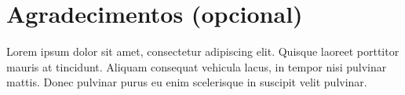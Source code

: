 \documentclass[a4paper,10pt,twocolumn]{article}
\begin{document}
\section*{Agradecimentos (opcional)}

Lorem ipsum dolor sit amet, consectetur adipiscing elit. Quisque laoreet porttitor mauris at tincidunt. Aliquam consequat vehicula lacus, in tempor nisi pulvinar mattis. Donec pulvinar purus eu enim scelerisque in suscipit velit pulvinar.


\end{document}
